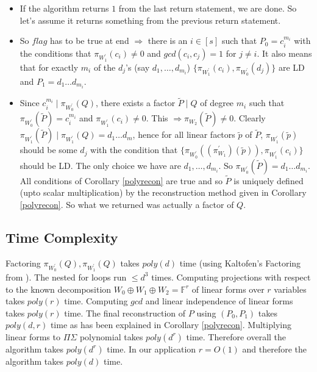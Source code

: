 \documentclass[letterpaper,USenglish,numberwithinsect]{lipics}
\newcommand{\F}{\mathbb{F}}
\begin{document}
\begin{itemize}
\item If the algorithm returns $1$ from the last return statement, we are done. So let's assume it returns something from
the previous return statement.
 \item So $flag$ has to be true at end $\Rightarrow$ there is an $i\in [s]$
such that $P_0 = c_i^{m_i}$ with the conditions that $\pi_{W_1^\prime}(c_i)\neq 0$ and $gcd(c_i,c_j)=1$ for $j\neq i$. It also means that for exactly
$m_i$ of the $d_j$'s (say $d_1,\ldots,d_{m_i}$) $\{\pi_{W_1^\prime}(c_i), \pi_{W_0^\prime}(d_j)\}$ are LD and $P_1 = d_1\ldots d_{m_i}$.
\item Since $c_i^{m_i} \mid \pi_{W_0^\prime}(Q)$, there exists a factor $\tilde P\mid Q$ of degree $m_i$
such that $\pi_{W_0^\prime}(\tilde P) = c_i^{m_i}$ and $\pi_{W_1^\prime}(c_i)\neq 0$. This $\Rightarrow \pi_{W_2}(\tilde P)\neq 0$.
Clearly $\pi_{W_1^\prime}(\tilde P) \mid \pi_{W_1^\prime}(Q) = d_1\ldots d_m$, hence for all linear factors $\tilde p$
of $\tilde P$, $\pi_{W_1^\prime}(\tilde p)$ should be some $d_j$ with the condition that
$\{\pi_{W_0^\prime}((\pi_{W_1}^\prime)(\tilde p)), \pi_{W_1^\prime}(c_i)\}$ should be LD. The only choice we have are $d_1,\ldots,d_{m_i}$.
So $\pi_{W_0^\prime}(\tilde P) = d_1\ldots d_{m_i}$. All conditions of Corollary \ref{polyrecon} are true and so $\tilde P$
is uniquely defined (upto scalar multiplication) by the reconstruction method given in Corollary \ref{polyrecon}.
So what we returned was actually a factor of $Q$.
\end{itemize}

\subsection{Time Complexity}

Factoring $\pi_{W_0^\prime}(Q),\pi_{W_1^\prime}(Q)$ takes $poly(d)$ time (using Kaltofen's Factoring from \cite{KalTr90}).
The nested for loops run $\leq d^3$ times.
Computing projections with respect to the known decomposition $W_0\oplus W_1\oplus W_2 =\F^r$ of linear forms
over $r$ variables takes $poly(r)$ time. Computing $gcd$ and linear independence of linear forms takes $poly(r)$ time.
The final reconstruction of $P$ using $(P_0,P_1)$ takes $poly(d,r)$ time as has been explained in Corollary \ref{polyrecon}.
Multiplying linear forms to $\Pi\Sigma$ polynomial takes $poly(d^r)$ time. Therefore overall the algorithm takes
$poly(d^r)$ time. In our application $r=O(1)$ and therefore the algorithm takes $poly(d)$ time.
\end{document}
